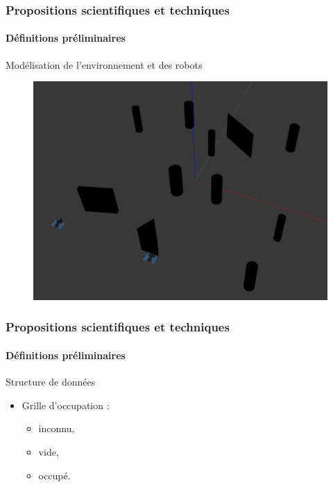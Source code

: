 \documentclass{beamer}
\begin{document}
			\begin{frame}
				\frametitle{Propositions scientifiques et techniques}
				\framesubtitle{Définitions préliminaires}
				Modélisation de l'environnement et des robots
				\begin{figure}[H]
					\centering
					\includegraphics[width=0.7\linewidth]{graphics/exemple_model.png}
				\end{figure}
			\end{frame}
			\begin{frame}
				\frametitle{Propositions scientifiques et techniques}
				\framesubtitle{Définitions préliminaires}
				\begin{block}{Structure de données}
					\begin{itemize}
						\item Grille d'occupation :
						\begin{itemize}
							\item inconnu,
							\item vide,
							\item occupé.
						\end{itemize}
					\end{itemize}
				\end{block}
			\end{frame}
\end{document}
